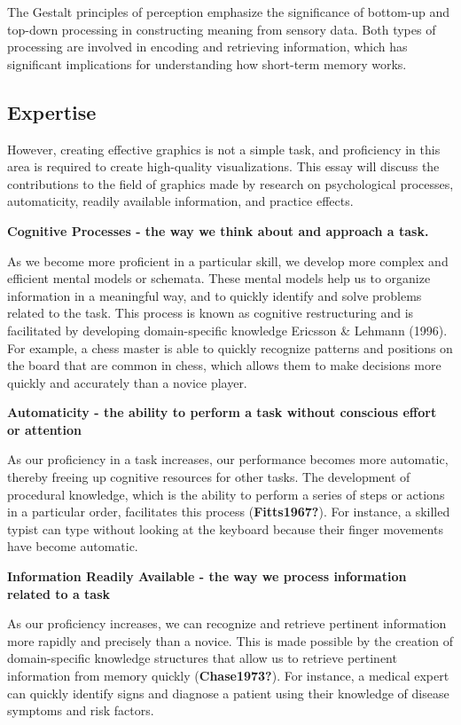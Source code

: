 \documentclass[print]{nuthesis}
\begin{document}
The Gestalt principles of perception emphasize the significance of bottom-up and top-down processing in constructing meaning from sensory data.
Both types of processing are involved in encoding and retrieving information, which has significant implications for understanding how short-term memory works.

\hypertarget{expertise}{%
\subsection{Expertise}\label{expertise}}

However, creating effective graphics is not a simple task, and proficiency in this area is required to create high-quality visualizations.
This essay will discuss the contributions to the field of graphics made by research on psychological processes, automaticity, readily available information, and practice effects.

\textbf{Cognitive Processes - the way we think about and approach a task.}

As we become more proficient in a particular skill, we develop more complex and efficient mental models or schemata.
These mental models help us to organize information in a meaningful way, and to quickly identify and solve problems related to the task.
This process is known as cognitive restructuring and is facilitated by developing domain-specific knowledge Ericsson \& Lehmann (1996).
For example, a chess master is able to quickly recognize patterns and positions on the board that are common in chess, which allows them to make decisions more quickly and accurately than a novice player.

\textbf{Automaticity - the ability to perform a task without conscious effort or attention}

As our proficiency in a task increases, our performance becomes more automatic, thereby freeing up cognitive resources for other tasks.
The development of procedural knowledge, which is the ability to perform a series of steps or actions in a particular order, facilitates this process (\textbf{Fitts1967?}).
For instance, a skilled typist can type without looking at the keyboard because their finger movements have become automatic.

\textbf{Information Readily Available - the way we process information related to a task}

As our proficiency increases, we can recognize and retrieve pertinent information more rapidly and precisely than a novice.
This is made possible by the creation of domain-specific knowledge structures that allow us to retrieve pertinent information from memory quickly (\textbf{Chase1973?}).
For instance, a medical expert can quickly identify signs and diagnose a patient using their knowledge of disease symptoms and risk factors.
\end{document}
